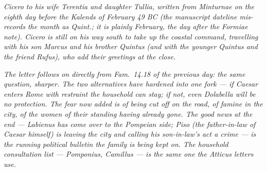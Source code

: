
\textit{Cicero to his wife Terentia and daughter Tullia,
written from Minturnae on the eighth day before the
Kalends of February 49 BC (the manuscript dateline
mis-records the month as \textit{Quint.}; it is plainly
February, the day after the Formiae note). Cicero is
still on his way south to take up the coastal command,
travelling with his son Marcus and his brother Quintus
(and with the younger Quintus and the friend Rufus),
who add their greetings at the close.}

\textit{The letter follows on directly from
\textit{Fam.}~14.18 of the previous day: the same
question, sharper. The two alternatives have hardened
into one fork --- if Caesar enters Rome with restraint
the household can stay; if not, even Dolabella will be
no protection. The fear now added is of being cut off
on the road, of famine in the city, of the women of
their standing having already gone. The good news at
the end --- Labienus has come over to the Pompeian
side; Piso (the father-in-law of Caesar himself) is
leaving the city and calling his son-in-law's act a
crime --- is the running political bulletin the family
is being kept on. The household consultation list ---
Pomponius, Camillus --- is the same one the Atticus
letters use.}
